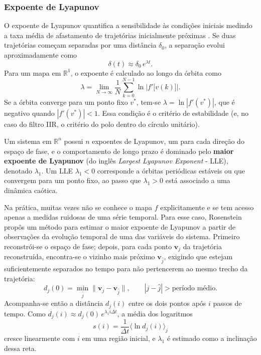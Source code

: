 \documentclass[]{article}
\begin{document}
	\subsubsection{Expoente de Lyapunov}
	\label{subsubsec:lyapunov}
	\noindent
	O expoente de Lyapunov quantifica a sensibilidade às condições iniciais medindo a taxa média de afastamento de trajetórias inicialmente próximas \cite{strogatz2015nonlinear, alligood1996chaos}. Se duas trajetórias começam separadas por uma distância $\delta_0$, a separação evolui aproximadamente como
	\begin{equation}
		\delta(t) \approx \delta_0\, e^{\lambda t}.
	\end{equation}
	Para um mapa em $\mathbb{R}^1$, o expoente é calculado ao longo da órbita como \cite{alligood1996chaos}
	\begin{equation}
		\lambda = \lim_{N \to \infty} \frac{1}{N} \sum_{k=0}^{N-1} \ln \big| f'\big[v(k)\big] \big|.
	\end{equation}
	Se a órbita converge para um ponto fixo $v^*$, tem-se $\lambda = \ln|f'(v^*)|$, que é negativo quando $|f'(v^*)| < 1$. Essa condição é o critério de estabilidade (e, no caso do filtro IIR, o critério do polo dentro do círculo unitário).

	Um sistema em $\mathbb{R}^n$ possui $n$ expoentes de Lyapunov, um para cada direção do espaço de fase, e o comportamento de longo prazo é dominado pelo \textbf{maior expoente de Lyapunov} (do inglês \textit{Largest Lyapunov Exponent} - LLE), denotado $\lambda_1$. Um LLE $\lambda_1 < 0$ corresponde a órbitas periódicas estáveis ou que convergem para um ponto fixo, ao passo que $\lambda_1 > 0$ está associado a uma dinâmica caótica.

	Na prática, muitas vezes não se conhece o mapa $f$ explicitamente e se tem acesso apenas a medidas ruidosas de uma série temporal. Para esse caso, Rosenstein \cite{rosenstein1993practical} propôs um método para estimar o maior expoente de Lyapunov a partir de observações da evolução temporal de uma das variáveis do sistema. Primeiro reconstrói-se o espaço de fase; depois, para cada ponto $\mathbf{v}_j$ da trajetória reconstruída, encontra-se o vizinho mais próximo $\mathbf{v}_{\hat{j}}$, exigindo que estejam suficientemente separados no tempo para não pertencerem ao mesmo trecho da trajetória:
	\begin{equation}
		d_j(0) = \min_{\hat{j}} \big\| \mathbf{v}_j - \mathbf{v}_{\hat{j}} \big\|, \qquad |j - \hat{j}| > \text{período médio}.
	\end{equation}
	Acompanha-se então a distância $d_j(i)$ entre os dois pontos após $i$ passos de tempo. Como $d_j(i) \approx d_j(0)\, e^{\lambda_1 i \Delta t}$, a média dos logaritmos
	\begin{equation}
		s(i) = \frac{1}{\Delta t} \big\langle \ln d_j(i) \big\rangle_j
	\end{equation}
	cresce linearmente com $i$ em uma região inicial, e $\lambda_1$ é estimado como a inclinação dessa reta.
\end{document}
